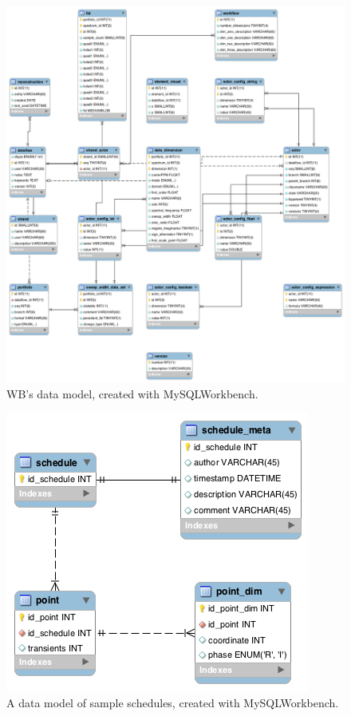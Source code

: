 \begin{figure}
  \includegraphics[scale=0.35]{figures/wb_model}
  \caption{WB's data model, created with MySQLWorkbench.}
  \label{wb_model}
\end{figure}

\begin{figure}
  \includegraphics[scale=0.5]{figures/schedule_model}
  \caption{A data model of sample schedules, created with MySQLWorkbench.}
  \label{schedule_model}
\end{figure}

